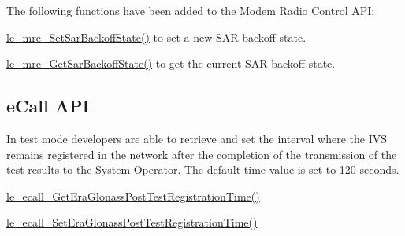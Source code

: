 The following functions have been added to the Modem Radio Control A\+PI\+:
\begin{DoxyItemize}
\item \hyperlink{le__mrc__interface_8h_adc99580fe5d419451e452cfcc805509d}{le\+\_\+mrc\+\_\+\+Set\+Sar\+Backoff\+State()} to set a new S\+AR backoff state.
\item \hyperlink{le__mrc__interface_8h_a8543cc2e58f0ddfcccca0942afda743a}{le\+\_\+mrc\+\_\+\+Get\+Sar\+Backoff\+State()} to get the current S\+AR backoff state.
\end{DoxyItemize}\hypertarget{releaseNotes18060_rn1806_Features_eCall}{}\subsection{e\+Call A\+PI}\label{releaseNotes18060_rn1806_Features_eCall}
In test mode developers are able to retrieve and set the interval where the I\+VS remains registered in the network after the completion of the transmission of the test results to the System Operator. The default time value is set to 120 seconds.
\begin{DoxyItemize}
\item \hyperlink{le__ecall__interface_8h_aaaba61357cfe615e90246c16f710a804}{le\+\_\+ecall\+\_\+\+Get\+Era\+Glonass\+Post\+Test\+Registration\+Time()}
\item \hyperlink{le__ecall__interface_8h_a184d79d22654450606130bb84b6907b1}{le\+\_\+ecall\+\_\+\+Set\+Era\+Glonass\+Post\+Test\+Registration\+Time()}
\end{DoxyItemize}

